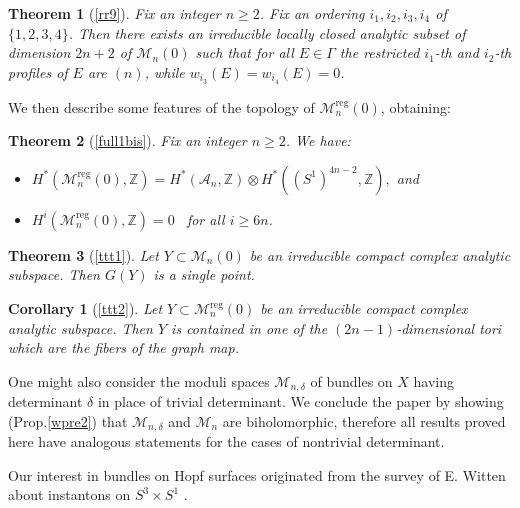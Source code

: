 \documentclass[
  a4paper, 
  reqno, 
  oneside, 
  11pt
]{amsart}
\theoremstyle{plain}	%
\newtheorem*{theorem*}{Theorem}
\newtheorem*{corollary*}{Corollary}
\theoremstyle{mydef} %
\theoremstyle{remark}
\theoremstyle{definition}
\theoremstyle{remark}
\DeclareMathOperator{\reg}{reg}
\begin{document}
\begin{theorem*}[\ref{rr9}]
Fix an integer $n\ge 2$. Fix an ordering $i_1,i_2,i_3,i_4$ of $\{1,2,3,4\}$. Then there exists an irreducible locally closed analytic subset of dimension $2n+2$ of $\mathcal M_n(0)$
such that for all $E\in \Gamma$ the restricted $i_1$-th and $i_2$-th profiles of $E$ are $(n)$, while $w_{i_3}(E)=w_{i_4}(E)=0$.
\end{theorem*}



We then describe some features of the topology of $\mathcal M_n^{\reg}(0)$, obtaining:

\begin{theorem*}[\ref{full1bis}]
Fix an integer $n\ge 2$. We have:
\begin{itemize}
\item[(i)]   $H^*(\mathcal M_n^{\reg}(0),\mathbb Z)= H^*(\mathcal A_n,\mathbb Z)\otimes H^*((S^1)^{4n-2},\mathbb Z),$
and 
\item[(ii)]   $H^i(\mathcal M_n^{\reg}(0),\mathbb Z)=0$ \ for all $i\ge 6n$.
\end{itemize}
\end{theorem*}

\begin{theorem*}[\ref{ttt1}]
Let $Y\subset \mathcal M_n(0)$ be an irreducible compact complex analytic subspace. Then $G(Y)$ is a single point.
\end{theorem*}


\begin{corollary*}[\ref{ttt2}]
Let $Y\subset \mathcal M_n^{\reg}(0)$ be an irreducible compact complex analytic subspace. Then $Y$ is contained in one of the $(2n-1)$-dimensional tori
which are the fibers of the graph map.
\end{corollary*}

One might also consider the moduli spaces $\mathcal M_{n, \delta}$ of bundles on $X$ having 
determinant $\delta$ in place of trivial determinant. 
We conclude the paper by showing (Prop.\thinspace \ref{wpre2}) that $\mathcal M_{n, \delta}$ and $\mathcal M_n$ are biholomorphic, 
therefore all results proved here have analogous statements for the cases of nontrivial determinant. 

Our interest in bundles on Hopf surfaces originated from the survey of E. Witten 
about instantons on $S^3 \times S^1$
\cite{W}.
\end{document}
